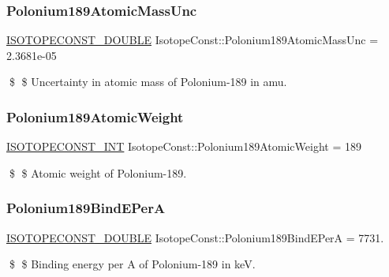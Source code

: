 \subsubsection{\texorpdfstring{Polonium189\+Atomic\+Mass\+Unc}{Polonium189AtomicMassUnc}}
{\footnotesize\ttfamily \mbox{\hyperlink{group___isotope_const-_macros_ga8f45a7272ce02c0b4c65c44636ed719a}{I\+S\+O\+T\+O\+P\+E\+C\+O\+N\+S\+T\+\_\+\+D\+O\+U\+B\+LE}} Isotope\+Const\+::\+Polonium189\+Atomic\+Mass\+Unc = 2.\+3681e-\/05}

\$ \$ Uncertainty in atomic mass of Polonium-\/189 in amu. \mbox{\label{group___isotope_const-_polonium-_po189_ga7184cce8b19949bc079fc52bf4e177e2}} 
\subsubsection{\texorpdfstring{Polonium189\+Atomic\+Weight}{Polonium189AtomicWeight}}
{\footnotesize\ttfamily \mbox{\hyperlink{group___isotope_const-_macros_ga5f18360b3e99483a35c32d789e62621c}{I\+S\+O\+T\+O\+P\+E\+C\+O\+N\+S\+T\+\_\+\+I\+NT}} Isotope\+Const\+::\+Polonium189\+Atomic\+Weight = 189}

\$ \$ Atomic weight of Polonium-\/189. \mbox{\label{group___isotope_const-_polonium-_po189_gaf7638fdb8be349088ca414eccb92ab89}} 
\subsubsection{\texorpdfstring{Polonium189\+Bind\+E\+PerA}{Polonium189BindEPerA}}
{\footnotesize\ttfamily \mbox{\hyperlink{group___isotope_const-_macros_ga8f45a7272ce02c0b4c65c44636ed719a}{I\+S\+O\+T\+O\+P\+E\+C\+O\+N\+S\+T\+\_\+\+D\+O\+U\+B\+LE}} Isotope\+Const\+::\+Polonium189\+Bind\+E\+PerA = 7731.}

\$ \$ Binding energy per A of Polonium-\/189 in keV. \mbox{\label{group___isotope_const-_polonium-_po189_gac3beffd3d49655c888c822d0017d714e}} 
